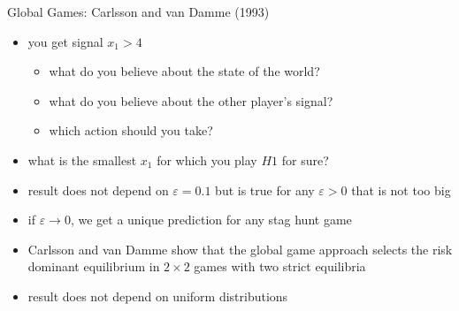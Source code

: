 \documentclass[bigger,allowframebreaks]{beamer}
\begin{document}
\begin{frame}[allowframebreaks,label=]{Global Games: Carlsson and van Damme (1993)}
\framebreak
\begin{itemize}
\item you get signal $x_1>4$
\begin{itemize}
\item what do you believe about the state of the world?
\item what do you believe about the other player's signal?
\item which action should you take?
\end{itemize}

\item what is the smallest $x_1$ for which you play $H1$ for sure?
\end{itemize}

\framebreak

\begin{itemize}
\item result does not depend on $\varepsilon =0.1$ but is true for any $\varepsilon >0$ that is not too big
\item if $\varepsilon \rightarrow 0$, we get a unique prediction for any stag hunt game
\item Carlsson and van Damme show that the global game approach selects the risk dominant equilibrium in $2\times2$ games with two strict equilibria
\item result does not depend on uniform distributions
\end{itemize}
\end{frame}
\end{document}
